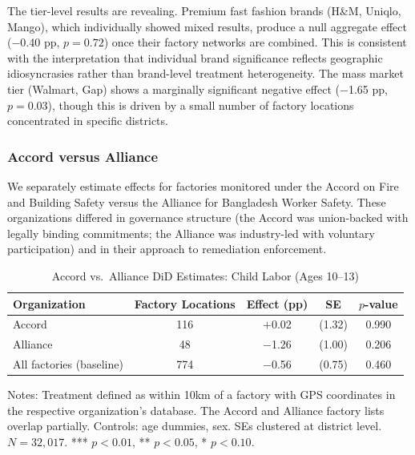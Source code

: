 \documentclass[12pt]{article}
\begin{document}
The tier-level results are revealing. Premium fast fashion brands (H\&M, Uniqlo, Mango), which individually showed mixed results, produce a null aggregate effect ($-$0.40 pp, $p = 0.72$) once their factory networks are combined. This is consistent with the interpretation that individual brand significance reflects geographic idiosyncrasies rather than brand-level treatment heterogeneity. The mass market tier (Walmart, Gap) shows a marginally significant negative effect ($-$1.65 pp, $p = 0.03$), though this is driven by a small number of factory locations concentrated in specific districts.

\subsubsection{Accord versus Alliance}

We separately estimate effects for factories monitored under the Accord on Fire and Building Safety versus the Alliance for Bangladesh Worker Safety. These organizations differed in governance structure (the Accord was union-backed with legally binding commitments; the Alliance was industry-led with voluntary participation) and in their approach to remediation enforcement.

\begin{table}[H]
\centering
\caption{Accord vs.\ Alliance DiD Estimates: Child Labor (Ages 10--13)}
\label{tab:accord_alliance}
\begin{threeparttable}
\begin{tabular}{lcccc}
\toprule
Organization & Factory Locations & Effect (pp) & SE & $p$-value \\
\midrule
Accord & 116 & $+$0.02 & (1.32) & 0.990 \\
Alliance & 48 & $-$1.26 & (1.00) & 0.206 \\
All factories (baseline) & 774 & $-$0.56 & (0.75) & 0.460 \\
\bottomrule
\end{tabular}
\begin{tablenotes}
\footnotesize
\item Notes: Treatment defined as within 10km of a factory with GPS coordinates in the respective organization's database. The Accord and Alliance factory lists overlap partially. Controls: age dummies, sex. SEs clustered at district level. $N = 32{,}017$. *** $p<0.01$, ** $p<0.05$, * $p<0.10$.
\end{tablenotes}
\end{threeparttable}
\end{table}
\end{document}
